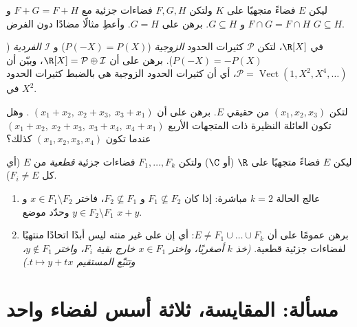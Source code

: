 \begin{exercise}[$\star\star\star$]\label{exo:b1:vspaces:9}
ليكن $E$ فضاءً متجهيًا على $K$ ولتكن $F, G, H$ فضاءات جزئية مع $F + G =
F + H$ و $F \cap G = F \cap H$ و $G \subseteq H$. برهن على $G = H$.
وأعطِ مثالًا مضادًا دون الفرض $G \subseteq H$.
\end{exercise}

\begin{exercise}[$\star\star$]\label{exo:b1:vspaces:10}
في $\R[X]$، لتكن $\mathcal P$  كثيرات الحدود \emph{الزوجية}
($P(-X) = P(X)$) و $\mathcal I$  \emph{الفردية}
($P(-X) = -P(X)$). برهن على أن $\R[X] = \mathcal P \oplus \mathcal
I$، وبيّن أن $\mathcal P =
\operatorname{Vect}(1, X^2, X^4, \dots)$، أي أن كثيرات الحدود
الزوجية هي بالضبط كثيرات الحدود في $X^2$.
\end{exercise}

\begin{exercise}[$\star\star$]\label{exo:b1:vspaces:11}
لتكن $(x_1, x_2, x_3)$  من  حقيقي $E$.
برهن على أن $(x_1 + x_2,\ x_2 + x_3,\ x_3 + x_1)$ . وهل تكون
العائلة النظيرة ذات المتجهات الأربع $(x_1 + x_2,\ x_2 + x_3,\ x_3 +
x_4,\ x_4 + x_1)$  عندما تكون $(x_1, x_2, x_3, x_4)$ كذلك؟
\end{exercise}

\begin{exercise}[$\star\star\star$]\label{exo:b1:vspaces:12}
ليكن $E$ فضاءً متجهيًا على $\R$ (أو $\C$) ولتكن $F_1, \dots,
F_k$ فضاءات جزئية \emph{قطعية} من $E$ (أي كل $F_i \neq E$).
\begin{enumerate}
  \item عالج الحالة $k = 2$ مباشرة: إذا كان $F_1 \not\subseteq
        F_2$ و $F_2 \not\subseteq F_1$، فاختر $x \in F_1
        \setminus F_2$ و $y \in F_2 \setminus F_1$ وحدّد موضع $x
        + y$.
  \item برهن عمومًا على أن $E \neq F_1 \cup \dots \cup F_k$: أي إن
         على  غير منته ليس أبدًا اتحادًا منتهيًا
        لفضاءات جزئية قطعية. \emph{(خذ $k$ أصغريًا، واختر
        $x \in F_1$ خارج بقية $F_i$، واختر $y \notin F_1$،
        وتتبّع المستقيم $t \mapsto y + tx$.)}
\end{enumerate}
\end{exercise}

\section{مسألة: المقايسة، ثلاثة أسس لفضاء واحد}


